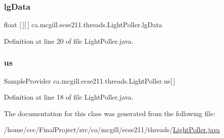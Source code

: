 \subsubsection{\texorpdfstring{lg\+Data}{lgData}}
{\footnotesize\ttfamily float \mbox{[}$\,$\mbox{]}\mbox{[}$\,$\mbox{]} ca.\+mcgill.\+ecse211.\+threads.\+Light\+Poller.\+lg\+Data\hspace{0.3cm}{\ttfamily [protected]}}



Definition at line 20 of file Light\+Poller.\+java.

\mbox{\label{classca_1_1mcgill_1_1ecse211_1_1threads_1_1_light_poller_ab6a9cb770bbf71f586697633db1475ff}} 
\subsubsection{\texorpdfstring{us}{us}}
{\footnotesize\ttfamily Sample\+Provider ca.\+mcgill.\+ecse211.\+threads.\+Light\+Poller.\+us\mbox{[}$\,$\mbox{]}\hspace{0.3cm}{\ttfamily [protected]}}



Definition at line 18 of file Light\+Poller.\+java.



The documentation for this class was generated from the following file\+:\begin{DoxyCompactItemize}
\item 
/home/ccc/\+Final\+Project/src/ca/mcgill/ecse211/threads/\hyperlink{_light_poller_8java}{Light\+Poller.\+java}\end{DoxyCompactItemize}
